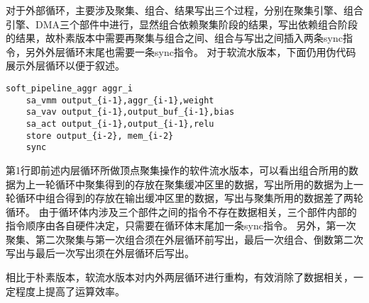 对于外部循环，主要涉及聚集、组合、结果写出三个过程，分别在聚集引擎、组合引擎、DMA三个部件中进行，显然组合依赖聚集阶段的结果，写出依赖组合阶段的结果，故朴素版本中需要再聚集与组合之间、组合与写出之间插入两条sync指令，另外外层循环末尾也需要一条sync指令。
对于软流水版本，下面仍用伪代码展示外层循环以便于叙述。
\begin{lstlisting}[language={[x86masm]Assembler}] 
    soft_pipeline_aggr aggr_i
    sa_vmm output_{i-1},aggr_{i-1},weight
    sa_vav output_{i-1},output_buf_{i-1},bias
    sa_act output_{i-1},output_{i-1},relu
    store output_{i-2}, mem_{i-2}
    sync
\end{lstlisting}
第1行即前述内层循环所做顶点聚集操作的软件流水版本，可以看出组合所用的数据为上一轮循环中聚集得到的存放在聚集缓冲区里的数据，写出所用的数据为上一轮循环中组合得到的存放在输出缓冲区里的数据，写出与聚集所用的数据差了两轮循环。
由于循环体内涉及三个部件之间的指令不存在数据相关，三个部件内部的指令顺序由各自硬件决定，只需要在循环体末尾加一条sync指令。
另外，第一次聚集、第二次聚集与第一次组合须在外层循环前写出，最后一次组合、倒数第二次写出与最后一次写出须在外层循环后写出。

相比于朴素版本，软流水版本对内外两层循环进行重构，有效消除了数据相关，一定程度上提高了运算效率。
